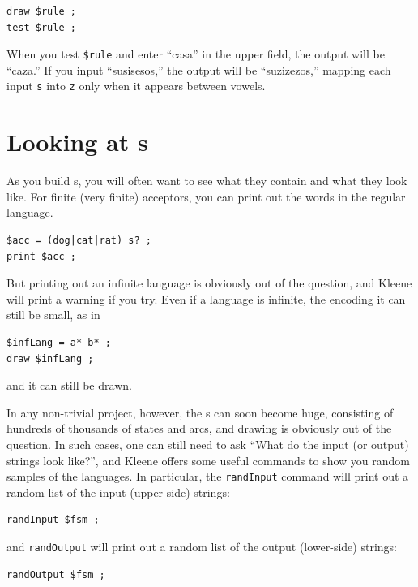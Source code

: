 \begin{Verbatim}
draw $rule ;
test $rule ;
\end{Verbatim}

\noindent
When you test \verb!$rule! and enter ``casa'' in the upper field, the output will be ``caza.''  If you input
``susisesos,'' the output will be ``suzizezos,'' mapping each input \texttt{s} into \texttt{z} only when it
appears between vowels.


\section{Looking at \fsm{}s}

As you build \fsm{}s, you will often want to see what they contain and what they look like. 
For finite (very finite) acceptors, you can print out the words in the regular language.


\begin{Verbatim}
$acc = (dog|cat|rat) s? ;
print $acc ;
\end{Verbatim}

\noindent
But printing out an infinite language is obviously out of the question, and Kleene will print
a warning if you try.  Even if a language
is infinite, the \fsm{} encoding it can still be small, as in

\begin{Verbatim}
$infLang = a* b* ;
draw $infLang ;
\end{Verbatim}

\noindent
and it can still be drawn.

In any non-trivial project, however, the \fsm{}s can soon become huge, consisting of hundreds of
thousands of states and arcs, and drawing is obviously out of the question.  In such cases,
one can still need to ask ``What do the input (or output) strings look like?'', and Kleene
offers some useful commands to show you random samples of the languages.  
In particular, the \texttt{randInput} command will print out
a random list of the input (upper-side) strings:

\begin{Verbatim}
randInput $fsm ;
\end{Verbatim}

\noindent
and \texttt{randOutput} will print out a random list of the output (lower-side) strings:

\begin{Verbatim}
randOutput $fsm ;
\end{Verbatim}

